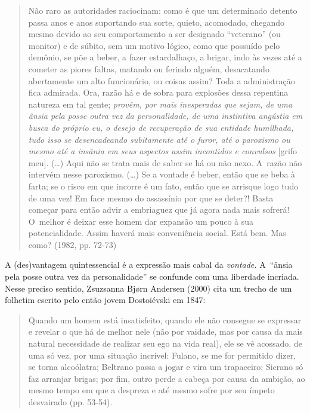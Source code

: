 \begin{quote}
Não raro as autoridades raciocinam: como é que um determinado detento
passa anos e anos suportando sua sorte, quieto, acomodado, chegando
mesmo devido ao seu comportamento a ser designado ``veterano'' (ou
monitor) e de súbito, sem um motivo lógico, como que possuído pelo
demônio, se põe a beber, a fazer estardalhaço, a brigar, indo às vezes
até a cometer as piores faltas, matando ou ferindo alguém, desacatando
abertamente um alto funcionário, ou coisas assim? Toda a administração
fica admirada. Ora, razão há e de sobra para explosões dessa repentina
natureza em tal gente; \emph{provêm, por mais inesperadas que sejam, de
uma ânsia pela posse outra vez da personalidade, de uma instintiva
angústia em busca do próprio eu, o desejo de recuperação de sua entidade
humilhada, tudo isso se desencadeando subitamente até o furor, até o
paroxismo ou mesmo até a insânia em seus aspectos assim incontidos e
convulsos} {[}grifo meu{]}. (\ldots) Aqui não se trata mais de saber se há
ou não nexo. A~razão não intervém nesse paroxismo. (\ldots) Se a vontade é
beber, então que se beba à farta; se o risco em que incorre é um fato,
então que se arrisque logo tudo de uma vez! Em face mesmo do assassínio
por que se deter?! Basta começar para então advir a embriaguez que já
agora nada mais sofrerá! O~melhor é deixar esse homem dar expansão um
pouco à sua potencialidade. Assim haverá mais conveniência social. Está
bem. Mas como? (1982, pp. 72-73)
\end{quote}

A (des)vantagem quintessencial é a expressão mais cabal da
\emph{vontade.} A~``ânsia pela posse outra vez da personalidade'' se
confunde com uma liberdade incriada. Nesse preciso sentido, Zsuzsanna
Bjørn Andersen (2000) cita um trecho de um folhetim escrito pelo então
jovem Dostoiévski em 1847:

\begin{quote}
Quando um homem está insatisfeito, quando ele não consegue se expressar
e revelar o que há de melhor nele (não por vaidade, mas por causa da
mais natural necessidade de realizar seu ego na vida real), ele se vê
acossado, de uma só vez, por uma situação incrível: Fulano, se me for
permitido dizer, se torna alcoólatra; Beltrano passa a jogar e vira um
trapaceiro; Sicrano só faz arranjar brigas; por fim, outro perde a
cabeça por causa da ambição, ao mesmo tempo em que a despreza e até
mesmo sofre por seu ímpeto desvairado (pp. 53-54).
\end{quote}

